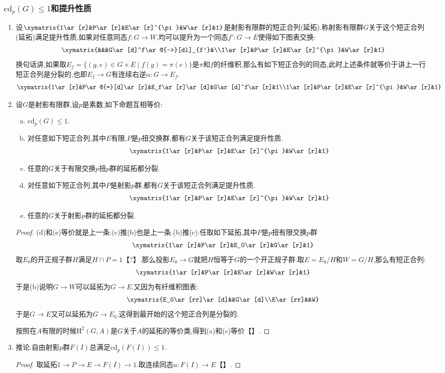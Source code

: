 \subsubsection{$\mathrm{cd}_p(G)\le1$和提升性质}
\begin{enumerate}
	\item 设$\xymatrix{1\ar[r]&P\ar[r]&E\ar[r]^{\pi}&W\ar[r]&1}$是射影有限群的短正合列(延拓).称射影有限群$G$关于这个短正合列(延拓)满足提升性质,如果对任意同态$f:G\to W$,均可以提升为一个同态$f':G\to E$使得如下图表交换:
	$$\xymatrix{&&&G\ar[d]^f\ar@{-->}[dl]_{f'}&\\1\ar[r]&P\ar[r]&E\ar[r]^{\pi}&W\ar[r]&1}$$
	换句话讲,如果取$E_f=\{(g,e)\in G\times E\mid f(g)=\pi(e)\}$是$\pi$和$f$的纤维积,那么有如下短正合列的同态,此时上述条件就等价于讲上一行短正合列是分裂的,也即$E_f\to G$有连续右逆$\alpha:G\to E_f$.
	$$\xymatrix{1\ar[r]&P\ar@{=}[d]\ar[r]&E_f\ar[r]\ar[d]&G\ar[d]^f\ar[r]&1\\1\ar[r]&P\ar[r]&E\ar[r]^{\pi}&W\ar[r]&1}$$
	\item 设$G$是射影有限群,设$p$是素数,如下命题互相等价:
	\begin{enumerate}[(a)]
		\item $\mathrm{cd}_p(G)\le1$.
		\item 对任意如下短正合列,其中$E$有限,$P$是$p$扭交换群,都有$G$关于该短正合列满足提升性质.
		$$\xymatrix{1\ar[r]&P\ar[r]&E\ar[r]^{\pi}&W\ar[r]&1}$$
		\item 任意的$G$关于有限交换$p$扭$p$群的延拓都分裂.
		\item 对任意如下短正合列,其中$P$是射影$p$群,都有$G$关于该短正合列满足提升性质.
		$$\xymatrix{1\ar[r]&P\ar[r]&E\ar[r]^{\pi}&W\ar[r]&1}$$
		\item 任意的$G$关于射影$p$群的延拓都分裂.
	\end{enumerate}
	\begin{proof}
		
		(d)和(e)等价就是上一条.(c)推(b)也是上一条.(b)推(c):任取如下延拓,其中$P$是$p$扭有限交换$p$群
		$$\xymatrix{1\ar[r]&P\ar[r]&E_0\ar[r]&G\ar[r]&1}$$
		取$E_0$的开正规子群$H$满足$H\cap P=1$【?】.那么投影$E_0\to G$就把$H$恒等于$G$的一个开正规子群.取$E=E_0/H$和$W=G/H$,那么有短正合列:
		$$\xymatrix{1\ar[r]&P\ar[r]&E\ar[r]&W\ar[r]&1}$$
		于是(b)说明$G\to W$可以延拓为$G\to E$.又因为有纤维积图表:
		$$\xymatrix{E_0\ar[rr]\ar[d]&&G\ar[d]\\E\ar[rr]&&W}$$
		于是$G\to E$又可以延拓为$G\to E_0$.这得到最开始的这个短正合列是分裂的.
		
		\qquad
		
		按照在$A$有限的时候$\mathrm{H}^2(G,A)$是$G$关于$A$的延拓的等价类,得到(a)和(c)等价【】.
		
		
	\end{proof}
	\item 推论.自由射影$p$群$F(I)$总满足$\mathrm{cd}_p(F(I))\le1$.
	\begin{proof}
		
		取延拓$1\to P\to E\to F(I)\to1$.取连续同态$u:F(I)\to E$【】.
	\end{proof}
\end{enumerate}




